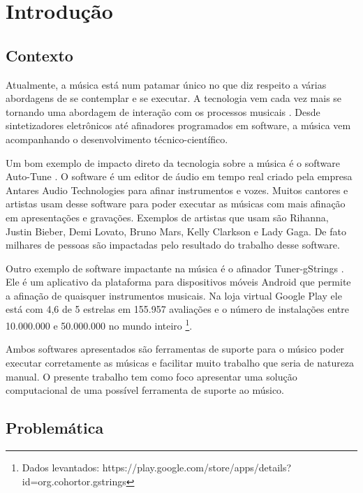 \chapter[Introdução]{Introdução}
\label{chap:introducao}

\section{Contexto}
\label{sec:contexto}

Atualmente, a música está num patamar único no que diz respeito a várias abordagens de se contemplar e se executar. A tecnologia vem cada vez mais se tornando uma abordagem de interação com os processos musicais \cite{makingmusictechnology}. Desde sintetizadores eletrônicos até afinadores programados em software, a música vem acompanhando o desenvolvimento técnico-científico.

Um bom exemplo de impacto direto da tecnologia sobre a música é o software Auto-Tune \cite{autotune}. O software é um editor de áudio em tempo real criado pela empresa Antares Audio Technologies \cite{autotune2} para afinar instrumentos e vozes. Muitos cantores e artistas usam desse software para poder executar as músicas com mais afinação em apresentações e gravações. Exemplos de artistas que usam são Rihanna, Justin Bieber, Demi Lovato, Bruno Mars, Kelly Clarkson e Lady Gaga. De fato milhares de pessoas são impactadas pelo resultado do trabalho desse software.

Outro exemplo de software impactante na música é o afinador Tuner-gStrings \cite{afinador}. Ele é um aplicativo da plataforma para dispositivos móveis Android que permite a afinação de quaisquer instrumentos musicais. Na loja virtual Google Play ele está com 4,6 de 5 estrelas em 155.957 avaliações e o número de instalações entre 10.000.000 e 50.000.000 no mundo inteiro \footnote{Dados levantados: https://play.google.com/store/apps/details?id=org.cohortor.gstrings}.

Ambos softwares apresentados são ferramentas de suporte para o músico poder executar corretamente as músicas e facilitar muito trabalho que seria de natureza manual. O presente trabalho tem como foco apresentar uma solução computacional de uma possível ferramenta de suporte ao músico.


\section{Problemática}
\label{sec:problematica}


